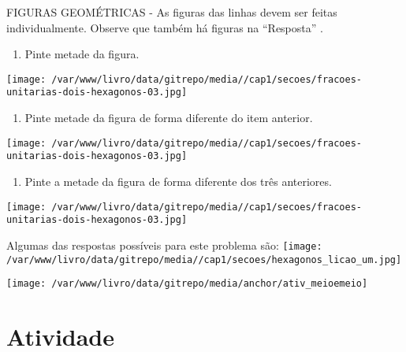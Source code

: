 \documentclass[a4paper,12pt,twoside]{book}
\begin{document}
\begin{imagem*}[breakable]{}{}   FIGURAS GEOMÉTRICAS - As figuras das linhas devem ser feitas individualmente. Observe que também há figuras na   ``Resposta''  .  
\end{imagem*}
\begin{enumerate} [\quad a)] %
  \item     Pinte metade da figura. 
\end{enumerate} %
\mbox{} \newline  \texttt{[image: /var/www/livro/data/gitrepo/media//cap1/secoes/fracoes-unitarias-dois-hexagonos-03.jpg]}
\begin{enumerate} [\quad a)] %
  \item     Pinte metade da figura de forma diferente do item anterior. 
\end{enumerate} %
\mbox{} \newline  \texttt{[image: /var/www/livro/data/gitrepo/media//cap1/secoes/fracoes-unitarias-dois-hexagonos-03.jpg]}
\begin{enumerate} [\quad a)] %
  \item     Pinte a metade da figura de forma diferente dos três anteriores. 
\end{enumerate} %
\mbox{} \newline  \texttt{[image: /var/www/livro/data/gitrepo/media//cap1/secoes/fracoes-unitarias-dois-hexagonos-03.jpg]}



\begin{resposta*}[breakable]{}{}  
  
  Algumas das respostas possíveis para este problema são:  
    \texttt{[image: /var/www/livro/data/gitrepo/media//cap1/secoes/hexagonos\_licao\_um.jpg]}  
  
\end{resposta*}



\texttt{[image: /var/www/livro/data/gitrepo/media/anchor/ativ\_meioemeio]}
\section{Atividade}
\end{document}
